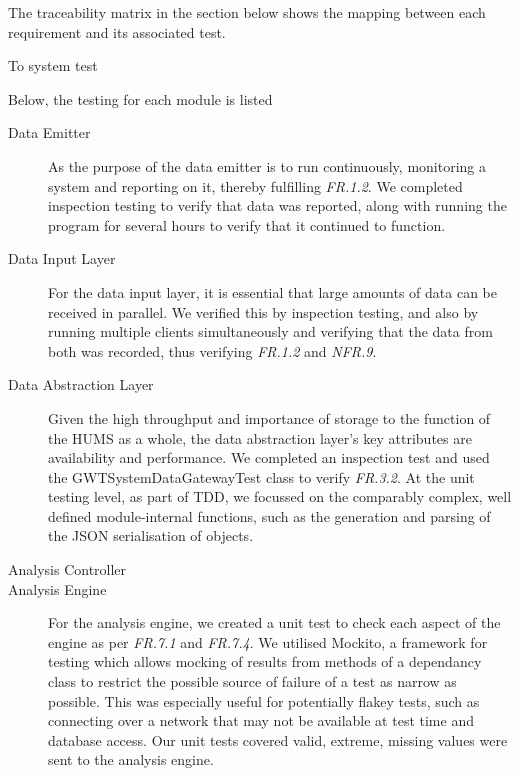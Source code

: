 \documentclass[10pt,a4paper]{article}
\newcommand{\frit}[1]{\textit{FR.#1}}
\newcommand{\nfrit}[1]{\textit{NFR.#1}}
\begin{document}
The traceability matrix in the section below shows the mapping 
between each requirement and its associated test.


To system test

Below, the testing for each module is listed

\begin{description}

  \item[Data Emitter] As the purpose of the data emitter is to run
    continuously, monitoring a system and reporting on it, thereby
    fulfilling \frit{1.2}. We completed inspection testing to verify 
    that data was reported, along with running the program for 
    several hours to verify that it continued to function.

  \item[Data Input Layer] For the data input layer, it is essential that large
    amounts of data can be received in parallel. We verified this by
    inspection testing, and also by running multiple clients simultaneously and
    verifying that the data from both was recorded, thus verifying \frit{1.2}
    and \nfrit{9}.

  \item[Data Abstraction Layer] Given the high throughput and
    importance of storage to the function of the HUMS as a whole, the
    data abstraction layer's key attributes are availability and
    performance. We completed an inspection test and used the 
    GWTSystemDataGatewayTest class to verify \frit{3.2}. At the unit 
    testing level, as  part of TDD, we focussed on the comparably complex,
    well defined module-internal functions, such as the generation and 
    parsing of the JSON serialisation of objects.
    
  \item[Analysis Controller] %
  
  \item[Analysis Engine]
  For the analysis engine, we created a unit test to check each aspect of the 
  engine as per \frit{7.1} and \frit{7.4}. We utilised Mockito, a framework 
  for testing which allows mocking of results from methods of a dependancy 
  class to restrict the possible source of failure of a test as narrow as possible. This was especially useful for potentially flakey tests, such as connecting over a network that may not be available at test time and database access. Our unit tests covered valid, extreme, missing values were sent to the analysis engine.


\end{description}
\end{document}
